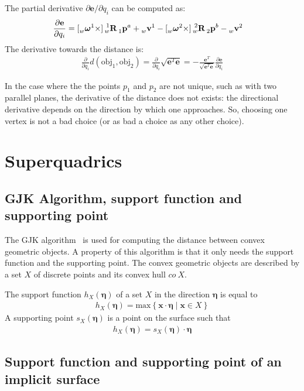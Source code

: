 \documentclass[10pt,a4paper]{article}
\newcommand{\rotm}[2]{ \prescript{#2}{#1}{\mathbf{R}} }
\newcommand{\position}[2] {\prescript{}{#1}{\mathbf{p}}^{#2}}
\newcommand{\velocity}[2] {\prescript{}{#1}{\mathbf{v}}^{#2}}
\newcommand{\rotvelmat}[2] {[\prescript{}{#1}{\boldsymbol{\omega}}^{#2} \times ]}
\newcommand{\myvec}[1] {\mathbf{\boldsymbol{#1}}}
\begin{document}
The partial derivative $\partial \mathbf{e}/\partial q_i$ can be computed as:
\begin{align}
\frac{\partial \mathbf{e}}{\partial q_i} &=
\rotvelmat{w}{1}\rotm{w}{1}\position{1}{a} + \velocity{w}{1}
- \rotvelmat{w}{2}\rotm{w}{2}\position{2}{b} - \velocity{w}{2}
\end{align}
The derivative towards the distance is:
\begin{align}
\frac{\partial}{\partial q_i} d(\mathrm{obj}_1, \mathrm{obj}_2) =
\frac{\partial}{\partial q_i} \sqrt{ \mathbf{e}^T \mathbf{e}} =
-\frac{\mathbf{e}^T}{\sqrt{ \mathbf{e}^T \mathbf{e}}}\frac{\partial \mathbf{e}}{\partial q_i}
\end{align}

In the case where the the points $p_1$ and $p_2$ are not unique, such as with two parallel planes, the derivative of the distance does not exists: the directional derivative depends on the direction by which one approaches.  So, choosing one vertex is not a bad choice (or as bad a choice as any other choice).

\section{Superquadrics}

\subsection{GJK Algorithm, support function and supporting point}
The GJK algorithm~\cite{gilbert1988fast} is used for computing the distance between convex geometric objects.  A property of this algorithm is that it only needs the support function and the supporting point.  The convex geometric objects are described by a set $X$ of discrete points and its convex hull $co~X$.

The support function $h_X(\myvec{\eta})$ of a set $X$ in the direction $\myvec{\eta}$ is equal to
\begin{align}
h_X(\myvec{\eta}) = \mathrm{max}\left\lbrace  \myvec{x} \cdot \myvec{\eta} \mid \myvec{x} \in X \right\rbrace
\end{align}
A supporting point $s_X(\myvec{\eta})$ is a point on the surface such that
\begin{align}
h_X(\myvec{\eta}) = s_X(\myvec{\eta}) \cdot \myvec{\eta}
\end{align}

\subsection{Support function and supporting point of an implicit surface}
\end{document}
